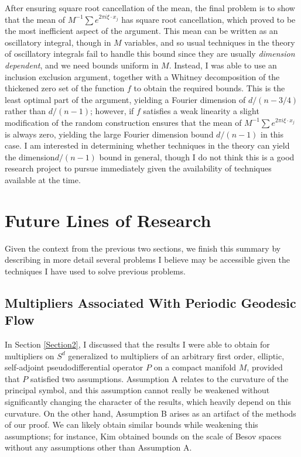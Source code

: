 \documentclass[11pt]{article}
\begin{document}
After ensuring square root cancellation of the mean, the final problem is to show that the mean of $M^{-1} \sum e^{2 \pi i \xi \cdot x_j}$ has square root cancellation, which proved to be the most inefficient aspect of the argument. This mean can be written as an oscillatory integral, though in $M$ variables, and so usual techniques in the theory of oscillatory integrals fail to handle this bound since they are usually \emph{dimension dependent}, and we need bounds uniform in $M$. Instead, I was able to use an inclusion exclusion argument, together with a Whitney decomposition of the thickened zero set of the function $f$ to obtain the required bounds. This is the least optimal part of the argument, yielding a Fourier dimension of $d/(n-3/4)$ rather than $d/(n-1)$; however, if $f$ satisfies a weak linearity a slight modification of the random construction ensures that the mean of $M^{-1} \sum e^{2 \pi i \xi \cdot x_j}$ is always zero, yielding the large Fourier dimension bound $d/(n-1)$ in this case. I am interested in determining whether techniques in the theory can yield the dimension$ d/(n-1)$ bound in general, though I do not think this is a good research project to pursue immediately given the availability of techniques available at the time.

\section{Future Lines of Research} \label{Section3}

Given the context from the previous two sections, we finish this summary by describing in more detail several problems I believe may be accessible given the techniques I have used to solve previous problems.

\subsection{Multipliers Associated With Periodic Geodesic Flow}

In Section \ref{Section2}, I discussed that the results I were able to obtain for multipliers on $S^d$ generalized to multipliers of an arbitrary first order, elliptic, self-adjoint pseudodifferential operator $P$ on a compact manifold $M$, provided that $P$ satisfied two assumptions. Assumption A relates to the curvature of the principal symbol, and this assumption cannot really be weakened without significantly changing the character of the results, which heavily depend on this curvature. On the other hand, Assumption B arises as an artifact of the methods of our proof. We can likely obtain similar bounds while weakening this assumptions; for instance, Kim \cite{KimManifold} obtained bounds on the scale of Besov spaces without any assumptions other than Assumption A.
\end{document}
